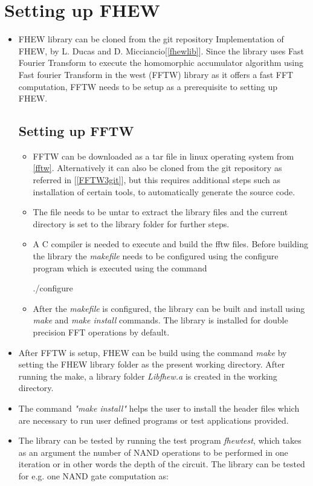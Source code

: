  \section{Setting up FHEW}
\begin{itemize}
\item
FHEW library can be cloned from the git repository Implementation of FHEW, by L. Ducas and D. Micciancio[\ref{fhewlib}]. Since the library uses Fast Fourier Transform to execute the homomorphic accumulator algorithm using Fast fourier Transform in the west (FFTW) library as it offers a fast FFT computation, FFTW needs to be setup as a prerequisite to setting up FHEW.
\subsection{Setting up FFTW} \label{3.4.1}
\begin{itemize}
\item
FFTW can be downloaded as a tar file in linux operating system from \ref{fftw}. Alternatively it can also be cloned from the git repository as referred in [\ref{FFTW3git}], but this requires additional steps such as installation of certain tools, to automatically generate the source code.
\item
The file needs to be untar to extract the library files and the current directory is set to the library folder for further steps.
\item 
A C compiler is needed to execute and build the fftw files. Before building the library the \textit{makefile} needs to be configured using the configure program which is executed using the command

\hspace{3cm} ./configure

\item
After the \textit{makefile} is configured, the library can be built and install using \textit{make} and \textit{make install} commands. The library is installed for double precision FFT operations by default.
\end{itemize}
\item
After FFTW is setup, FHEW can be build using the command \textit{make} by setting the FHEW library folder as the present working directory. After running the make, a library folder \textit{Libfhew.a} is created in the working directory.
\item
The command \textit{"make install"} helps the user to install the header files which are necessary to run user defined programs or test applications provided.
\item
The library can be tested by running the test program \textit{fhewtest}, which takes as an argument the number of NAND operations to be performed in one iteration or in other words the depth of the circuit.
The library can be tested for e.g. one NAND gate computation as:


\end{itemize}
